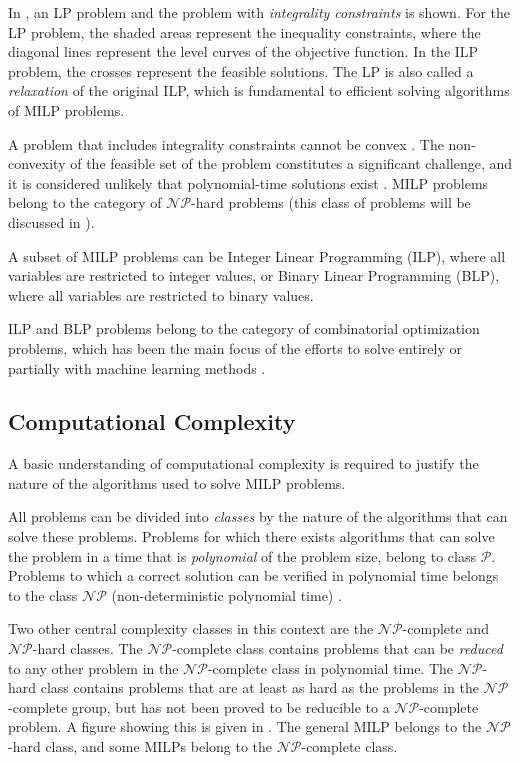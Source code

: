 In , an \gls{LP} problem and the problem with \textit{integrality constraints} is shown. For the \gls{LP} problem, the shaded areas represent the inequality constraints, where the diagonal lines represent the level curves of the objective function. In the \gls{ILP} problem, the crosses represent the feasible solutions. The \gls{LP} is also called a \textit{relaxation} of the original \gls{ILP}, which is fundamental to efficient solving algorithms of \gls{MILP} problems.

A problem that includes integrality constraints cannot be convex \cite{wolsey2020integer}. The non-convexity of the feasible set of the problem constitutes a significant challenge, and it is considered unlikely that polynomial-time solutions exist \cite{papadimitriou1982combinatorial}. \gls{MILP} problems belong to the category of $\mathcal{NP}$-hard problems \cite{papadimitriou1982combinatorial} (this class of problems will be discussed in ).   

A subset of \gls{MILP} problems can be Integer Linear Programming (\gls{ILP}), where all variables are restricted to integer values, or Binary Linear Programming (\gls{BLP}), where all variables are restricted to binary values. 

\gls{ILP} and \gls{BLP} problems belong to the category of combinatorial optimization problems, which has been the main focus of the efforts to solve entirely or partially with machine learning methods \cite{bengio2020machine}. 




\subsection{Computational Complexity}\label{ssec:complexity}

A basic understanding of computational complexity is required to justify the nature of the algorithms used to solve \gls{MILP} problems. 

All problems can be divided into \textit{classes} by the nature of the algorithms that can solve these problems. Problems for which there exists algorithms that can solve the problem in a time that is \textit{polynomial} of the problem size, belong to class $\mathcal{P}$. Problems to which a correct solution can be verified in polynomial time belongs to the class $\mathcal{NP}$ (non-deterministic polynomial time) \cite{cormen2009introduction}. 


Two other central complexity classes in this context are the $\mathcal{NP}$-complete and $\mathcal{NP}$-hard classes. The $\mathcal{NP}$-complete class contains problems that can be \textit{reduced} to any other problem in the $\mathcal{NP}$-complete class in polynomial time. 
The $\mathcal{NP}$-hard class contains problems that are at least as hard as the problems in the $\mathcal{NP}$-complete group, but has not been proved to be reducible to a $\mathcal{NP}$-complete problem. A figure showing this is given in . The general \gls{MILP} belongs to the $\mathcal{NP}$-hard class, and some \gls{MILP}s belong to the $\mathcal{NP}$-complete class. 


